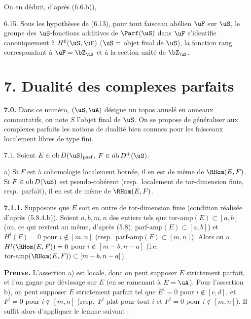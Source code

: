 On en d\'{e}duit, d'apr\`{e}s (6.6.b)),

\begin{corollaire} 6.15.
Sous les hypoth\`{e}ses de (6.13), pour tout faisceau ab\'{e}lien $\uF$ sur $\uS$, le groupe des $\uS$-fonctions additives de $\Parf(\uS)$ dans $\uF$ s'identifie canoniquement \`{a} $H^0(\uS,\uF)$ ($\uS = $ objet final de $\uS$), la fonction rang correspondant \`{a} $\uF = \bZ_{\uS}$ et \`{a} la section unit\'{e} de $\bZ_{\uS}$.
\end{corollaire}


\section*{7. Dualit\'{e} des complexes parfaits}

\noindent\textbf{7.0.} Dans ce num\'{e}ro, $(\uS,\uA)$ d\'{e}signe un topos annel\'{e} en anneaux commutatifs, on note $S$ l'objet final de $\uS$. On se propose de g\'{e}n\'{e}raliser aux complexes parfaits les notions de dualit\'{e} bien connues pour les faisceaux localement libres de type fini.

\begin{proposition} 7.1.
Soient $E \in \operatorname{ob} D(\uS)_{\mathrm{parf}}$, $F \in \operatorname{ob} D^+(\uS)$.

a) Si $F$ est \`{a} cohomologie localement born\'{e}e, il en est de m\^{e}me de $\RHom(E,F)$. Si $F \in \operatorname{ob} D(\uS)$ est pseudo-coh\'{e}rent (resp.~localement de tor-dimension finie, resp.~parfait), il en est de m\^{e}me de $\RHom(E,F)$.
\end{proposition}

\noindent\textbf{7.1.1.} Supposons que $E$ soit en outre de tor-dimension finie (condition r\'{e}alis\'{e}e d'apr\`{e}s (5.8.4.b)). Soient $a, b, m, n$ des entiers tels que $\mathrm{tor\text{-}amp}(E) \subset [a,b]$ (ou, ce qui revient au m\^{e}me, d'apr\`{e}s (5.8), $\mathrm{parf\text{-}amp}(E) \subset [a,b]$) et $H^i(F) = 0$ pour $i \notin [m,n]$ (resp.~$\mathrm{parf\text{-}amp}(F) \subset [m,n]$). Alors on a $H^i(\RHom(E,F)) = 0$ pour $i \notin [m-b,n-a]$ (i.e.~$\mathrm{tor\text{-}amp}(\RHom(E,F)) \subset [m-b,n-a]$).

\smallskip
\noindent\textbf{Preuve.} L'assertion a) est locale, donc on peut supposer $E$ strictement parfait, et l'on gagne par d\'{e}vissage sur $E$ (en se ramenant \`{a} $E = \uA$). Pour l'assertion b), on peut supposer $E$ strictement parfait tel que $E^i = 0$ pour $i \notin [c,d]$, et $F^i = 0$ pour $i \notin [m,n]$ (resp.~$F^i$ plat pour tout $i$ et $F^i = 0$ pour $i \notin [m,n]$). Il suffit alors d'appliquer le lemme suivant :

